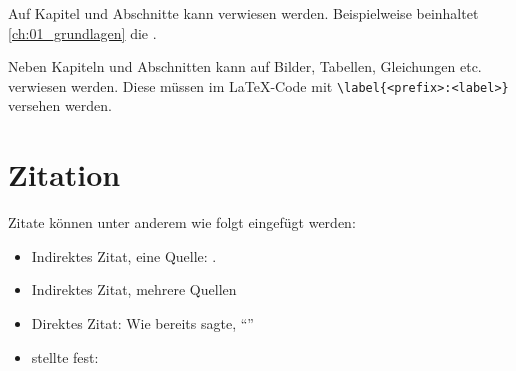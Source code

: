 
Auf Kapitel und Abschnitte kann verwiesen werden. Beispielweise beinhaltet \cref{ch:01_grundlagen} die .

Neben Kapiteln und Abschnitten kann auf Bilder, Tabellen, Gleichungen etc. verwiesen werden. Diese müssen im \LaTeX-Code mit \verb!\label{<prefix>:<label>}! versehen werden. 
\section{Zitation}
\label{sec:01_zitation}

Zitate können unter anderem wie folgt eingefügt werden:

\begin{itemize}

    \item Indirektes Zitat, eine Quelle: \cite{yang_application_2003}. 
    
    \item Indirektes Zitat, mehrere Quellen \cite{yang_application_2003, kroll_computational_2016}
    
    \item Direktes Zitat: Wie bereits \citet[][p.97]{yang_application_2003} sagte, \enquote{\lipsum[1][1]}
    
    \item \citet[][p.365]{yang_application_2003} stellte fest: \blockquote{\lipsum[1][2]}
    
\end{itemize}